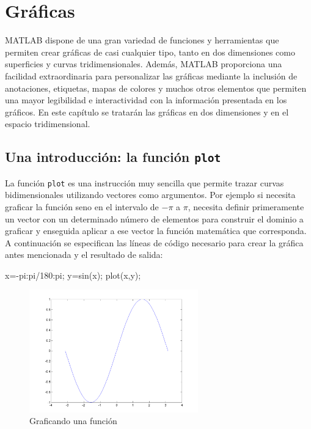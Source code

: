 \chapter{Gráficas}

MATLAB dispone de una gran variedad de funciones y herramientas que
permiten crear gráficas de casi cualquier tipo, tanto en dos dimensiones
como superficies y curvas tridimensionales. Además, MATLAB proporciona
una facilidad extraordinaria para personalizar las gráficas mediante la
inclusión de anotaciones, etiquetas, mapas de colores y muchos otros
elementos que permiten una mayor legibilidad e interactividad con la
información presentada en los gráficos. En este capítulo se tratarán las
gráficas en dos dimensiones y en el espacio tridimensional.

\section{Una introducción: la función \texttt{plot}}

La función \texttt{plot} es una instrucción muy sencilla que permite 
trazar curvas bidimensionales utilizando vectores como argumentos. Por
ejemplo si necesita graficar la función seno en el intervalo de
$-\pi$ a $\pi$, necesita definir primeramente un
vector con un determinado número de elementos para construir el dominio
a graficar y enseguida aplicar a ese vector la función matemática que
corresponda. A continuación se especifican las líneas de código
necesario para crear la gráfica antes mencionada y el resultado de
salida:

\begin{matlab}
x=-pi:pi/180:pi;
y=sin(x);
plot(x,y);
\end{matlab}


\begin{figure}[htbp]
    \centering
    \includegraphics[width=0.65\textwidth]{src/img/ch4/img_4_1.png}
    \caption{Graficando una función}
    \label{fig:img_4_1}
\end{figure}


